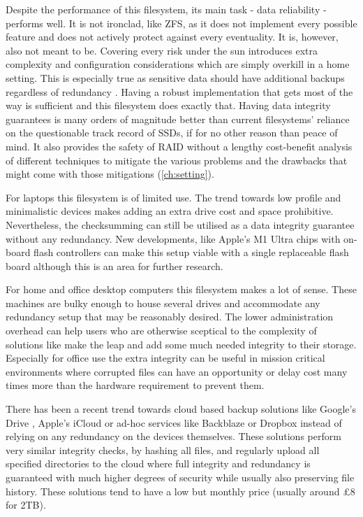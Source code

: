         Despite the performance of this filesystem, its main task - data
        reliability - performs well. It is not ironclad, like ZFS, as it does
        not implement every possible feature and does not actively protect
        against every eventuality. It is, however, also not meant to be.
        Covering every risk under the sun introduces extra complexity and
        configuration considerations which are simply overkill in a home
        setting. This is especially true as sensitive data should have
        additional backups  regardless of redundancy \cite{Backblaze_321}. Having
        a robust implementation that gets most of the way is sufficient and this
        filesystem does exactly that. Having data integrity guarantees is many
        orders of magnitude better than current filesystems' reliance on the
        questionable track record of SSDs, if for no other reason than peace of
        mind. It also provides the safety of RAID without a lengthy
        cost-benefit analysis of different techniques to mitigate the various
        problems and the drawbacks that might come with those mitigations
        (\autoref{ch:setting}).

        For laptops this filesystem is of limited use. The trend towards low
        profile and minimalistic devices makes adding an extra drive cost and
        space prohibitive. Nevertheless, the checksumming can still be utilised
        as a data integrity guarantee without any redundancy. New developments,
        like Apple's M1 Ultra chips with on-board flash controllers
        \cite{m1_ultra_controller} can make this setup viable with a single replaceable
        flash board although this is an area for further research.

        For home and office desktop computers this filesystem makes a lot of
        sense. These machines are bulky enough to house several drives and
        accommodate any redundancy setup that may be reasonably desired. The lower
        administration overhead can help users who are otherwise sceptical to the
        complexity of solutions like  make the leap and add some
        much needed integrity to their storage. Especially for office use the
        extra integrity can be useful in mission critical environments where
        corrupted files can have an opportunity or delay cost many times more than the hardware requirement
        to prevent them.

        There has been a recent trend towards cloud based backup solutions like
        Google's Drive \cite{gdrive}, Apple's iCloud \cite{icloud} or ad-hoc
        services like Backblaze \cite{Backblaze_321} or Dropbox \cite{dropbox}
        instead of relying on any redundancy on the devices themselves. These
        solutions perform very similar integrity checks, by hashing all files, and
        regularly upload all specified directories to the cloud where full
        integrity and redundancy is guaranteed \cite{Backblaze_arch} with much
        higher degrees of security while usually also preserving file history.
        These solutions tend to have a low but monthly price (usually around
        £8 for 2TB).


